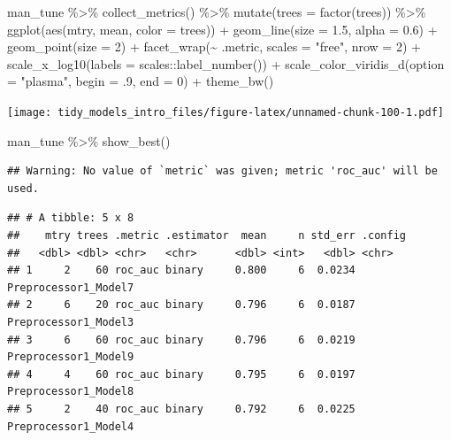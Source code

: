 \documentclass[
]{article}
\newenvironment{Shaded}{\begin{snugshade}}{\end{snugshade}}
\newcommand{\AttributeTok}[1]{\textcolor[rgb]{0.77,0.63,0.00}{#1}}
\newcommand{\DecValTok}[1]{\textcolor[rgb]{0.00,0.00,0.81}{#1}}
\newcommand{\FloatTok}[1]{\textcolor[rgb]{0.00,0.00,0.81}{#1}}
\newcommand{\FunctionTok}[1]{\textcolor[rgb]{0.00,0.00,0.00}{#1}}
\newcommand{\NormalTok}[1]{#1}
\newcommand{\SpecialCharTok}[1]{\textcolor[rgb]{0.00,0.00,0.00}{#1}}
\newcommand{\StringTok}[1]{\textcolor[rgb]{0.31,0.60,0.02}{#1}}
\begin{document}
\begin{Shaded}
\begin{Highlighting}[]
\NormalTok{man\_tune }\SpecialCharTok{\%\textgreater{}\%}
  \FunctionTok{collect\_metrics}\NormalTok{() }\SpecialCharTok{\%\textgreater{}\%}
  \FunctionTok{mutate}\NormalTok{(}\AttributeTok{trees =} \FunctionTok{factor}\NormalTok{(trees)) }\SpecialCharTok{\%\textgreater{}\%}
  \FunctionTok{ggplot}\NormalTok{(}\FunctionTok{aes}\NormalTok{(mtry, mean, }\AttributeTok{color =}\NormalTok{ trees)) }\SpecialCharTok{+}
  \FunctionTok{geom\_line}\NormalTok{(}\AttributeTok{size =} \FloatTok{1.5}\NormalTok{, }\AttributeTok{alpha =} \FloatTok{0.6}\NormalTok{) }\SpecialCharTok{+}
  \FunctionTok{geom\_point}\NormalTok{(}\AttributeTok{size =} \DecValTok{2}\NormalTok{) }\SpecialCharTok{+}
  \FunctionTok{facet\_wrap}\NormalTok{(}\SpecialCharTok{\textasciitilde{}}\NormalTok{ .metric, }\AttributeTok{scales =} \StringTok{"free"}\NormalTok{, }\AttributeTok{nrow =} \DecValTok{2}\NormalTok{) }\SpecialCharTok{+}
  \FunctionTok{scale\_x\_log10}\NormalTok{(}\AttributeTok{labels =}\NormalTok{ scales}\SpecialCharTok{::}\FunctionTok{label\_number}\NormalTok{()) }\SpecialCharTok{+}
  \FunctionTok{scale\_color\_viridis\_d}\NormalTok{(}\AttributeTok{option =} \StringTok{"plasma"}\NormalTok{, }\AttributeTok{begin =}\NormalTok{ .}\DecValTok{9}\NormalTok{, }\AttributeTok{end =} \DecValTok{0}\NormalTok{) }\SpecialCharTok{+}
  \FunctionTok{theme\_bw}\NormalTok{()}
\end{Highlighting}
\end{Shaded}

\texttt{[image: tidy\_models\_intro\_files/figure-latex/unnamed-chunk-100-1.pdf]}

\begin{Shaded}
\begin{Highlighting}[]
\NormalTok{man\_tune }\SpecialCharTok{\%\textgreater{}\%} \FunctionTok{show\_best}\NormalTok{()}
\end{Highlighting}
\end{Shaded}

\begin{verbatim}
## Warning: No value of `metric` was given; metric 'roc_auc' will be used.
\end{verbatim}

\begin{verbatim}
## # A tibble: 5 x 8
##    mtry trees .metric .estimator  mean     n std_err .config             
##   <dbl> <dbl> <chr>   <chr>      <dbl> <int>   <dbl> <chr>               
## 1     2    60 roc_auc binary     0.800     6  0.0234 Preprocessor1_Model7
## 2     6    20 roc_auc binary     0.796     6  0.0187 Preprocessor1_Model3
## 3     6    60 roc_auc binary     0.796     6  0.0219 Preprocessor1_Model9
## 4     4    60 roc_auc binary     0.795     6  0.0197 Preprocessor1_Model8
## 5     2    40 roc_auc binary     0.792     6  0.0225 Preprocessor1_Model4
\end{verbatim}
\end{document}
